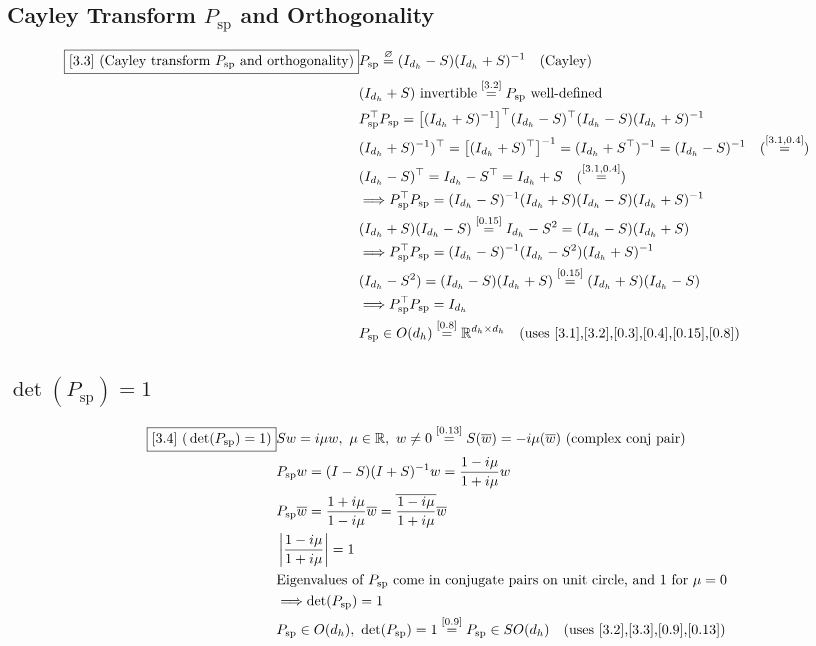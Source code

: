 \documentclass[11pt]{article}
\newcommand{\eqdef}{\overset{\varnothing}{=}}
\newcommand{\eqref}[1]{\overset{[#1]}{=}}
\begin{document}
\subsection{Cayley Transform $P_{\mathrm{sp}}$ and Orthogonality}

\begin{align}
\boxed{[3.3] \text{ (Cayley transform }P_{\mathrm{sp}}\text{ and orthogonality)}}
&P_{\mathrm{sp}}
\eqdef
(I_{d_h}-S)
(I_{d_h}+S)^{-1}
\quad(\text{Cayley}) \notag\\
&(I_{d_h}+S)
\text{ invertible}
\eqref{3.2}
P_{\mathrm{sp}}
\text{ well-defined} \notag\\
&P_{\mathrm{sp}}^\top
P_{\mathrm{sp}}
=
\big[(I_{d_h}+S)^{-1}\big]^\top
(I_{d_h}-S)^\top
(I_{d_h}-S)
(I_{d_h}+S)^{-1} \notag\\
&(I_{d_h}+S)^{-1})^\top
=
\big[(I_{d_h}+S)^\top\big]^{-1}
=
(I_{d_h}+S^\top)^{-1}
=
(I_{d_h}-S)^{-1}
\quad(\eqref{3.1,0.4}) \notag\\
&(I_{d_h}-S)^\top
=
I_{d_h}-S^\top
=
I_{d_h}+S
\quad(\eqref{3.1,0.4}) \notag\\
&\Longrightarrow
P_{\mathrm{sp}}^\top P_{\mathrm{sp}}
=
(I_{d_h}-S)^{-1}
(I_{d_h}+S)
(I_{d_h}-S)
(I_{d_h}+S)^{-1} \notag\\
&(I_{d_h}+S)
(I_{d_h}-S)
\eqref{0.15}
I_{d_h}-S^2
=
(I_{d_h}-S)
(I_{d_h}+S) \notag\\
&\Longrightarrow
P_{\mathrm{sp}}^\top P_{\mathrm{sp}}
=
(I_{d_h}-S)^{-1}
(I_{d_h}-S^2)
(I_{d_h}+S)^{-1} \notag\\
&(I_{d_h}-S^2)
=
(I_{d_h}-S)
(I_{d_h}+S)
\eqref{0.15}
(I_{d_h}+S)
(I_{d_h}-S) \notag\\
&\Longrightarrow
P_{\mathrm{sp}}^\top P_{\mathrm{sp}}
=
I_{d_h} \notag\\
&P_{\mathrm{sp}}\in O(d_h)
\eqref{0.8}
\mathbb{R}^{d_h\times d_h}
\quad(\text{uses [3.1],[3.2],[0.3],[0.4],[0.15],[0.8]})
\end{align}

\subsection{$\det(P_{\mathrm{sp}})=1$}

\begin{align}
\boxed{[3.4] \text{ (}\det(P_{\mathrm{sp}})=1\text{)}}
&Sw
=
i\mu w,\
\mu\in\mathbb{R},\
w\neq 0
\eqref{0.13}
S(\overline{w})
=
-i\mu(\overline{w})
\text{ (complex conj pair)} \notag\\
&P_{\mathrm{sp}} w
=
(I-S)(I+S)^{-1} w
=
\frac{1-i\mu}{1+i\mu}  w \notag\\
&P_{\mathrm{sp}} \overline{w}
=
\frac{1+i\mu}{1-i\mu}
\overline{w}
=
\overline{\frac{1-i\mu}{1+i\mu}}
\overline{w} \notag\\
&\left|
\frac{1-i\mu}{1+i\mu}
\right|
=
1 \notag\\
&\text{Eigenvalues of }P_{\mathrm{sp}}\text{ come in conjugate pairs on unit circle, and }1\text{ for }\mu=0 \notag\\
&\Longrightarrow
\det(P_{\mathrm{sp}})
=
1 \notag\\
&P_{\mathrm{sp}}
\in
O(d_h),\
\det(P_{\mathrm{sp}})=1
\eqref{0.9}
P_{\mathrm{sp}}
\in
SO(d_h)
\quad(\text{uses [3.2],[3.3],[0.9],[0.13]})
\end{align}
\end{document}

